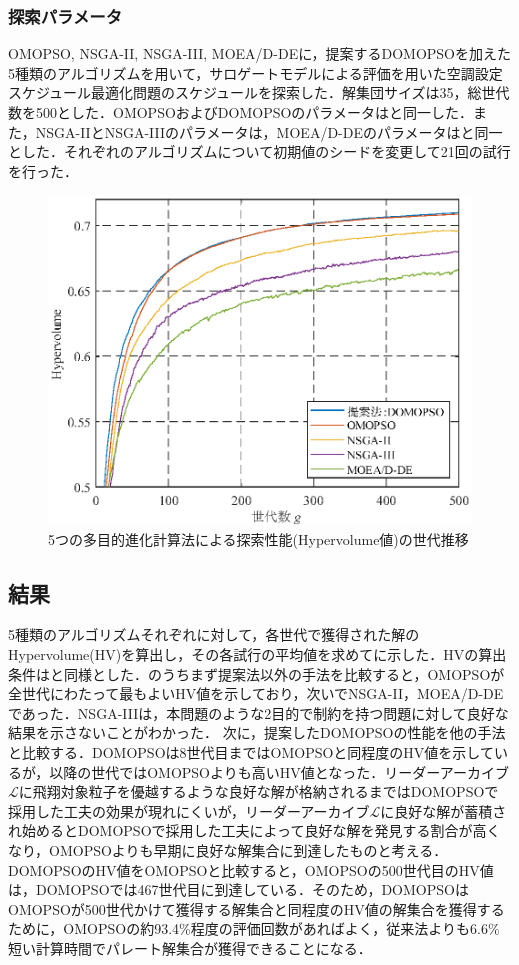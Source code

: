 \subsubsection{探索パラメータ}
OMOPSO, NSGA-II, NSGA-III, MOEA/D-DEに，提案するDOMOPSOを加えた5種類のアルゴリズムを用いて，サロゲートモデルによる評価を用いた空調設定スケジュール最適化問題のスケジュールを探索した．解集団サイズは35，総世代数を500とした．OMOPSOおよびDOMOPSOのパラメータはと同一した．また，NSGA-IIとNSGA-IIIのパラメータは，MOEA/D-DEのパラメータはと同一とした．それぞれのアルゴリズムについて初期値のシードを変更して21回の試行を行った．

\begin{figure}[htbp]
  \begin{center}
    \includegraphics[width=0.7\linewidth]{fig/surrogate_result_algorithm_HV.eps}
  \end{center}
  \caption{5つの多目的進化計算法による探索性能(Hypervolume値)の世代推移}
  \label{fig::surrogate_result_algorithm_HV}
\end{figure}
\subsection{結果}
5種類のアルゴリズムそれぞれに対して，各世代で獲得された解のHypervolume(HV)を算出し，その各試行の平均値を求めてに示した．HVの算出条件はと同様とした．のうちまず提案法以外の手法を比較すると，OMOPSOが全世代にわたって最もよいHV値を示しており，次いでNSGA-II，MOEA/D-DEであった．NSGA-IIIは，本問題のような2目的で制約を持つ問題に対して良好な結果を示さないことがわかった．
次に，提案したDOMOPSOの性能を他の手法と比較する．DOMOPSOは8世代目まではOMOPSOと同程度のHV値を示しているが，以降の世代ではOMOPSOよりも高いHV値となった．リーダーアーカイブ$\mathcal{L}$に飛翔対象粒子を優越するような良好な解が格納されるまではDOMOPSOで採用した工夫の効果が現れにくいが，リーダーアーカイブ$\mathcal{L}$に良好な解が蓄積され始めるとDOMOPSOで採用した工夫によって良好な解を発見する割合が高くなり，OMOPSOよりも早期に良好な解集合に到達したものと考える．DOMOPSOのHV値をOMOPSOと比較すると，OMOPSOの500世代目のHV値は，DOMOPSOでは467世代目に到達している．そのため，DOMOPSOはOMOPSOが500世代かけて獲得する解集合と同程度のHV値の解集合を獲得するために，OMOPSOの約93.4\%程度の評価回数があればよく，従来法よりも6.6\%短い計算時間でパレート解集合が獲得できることになる．

